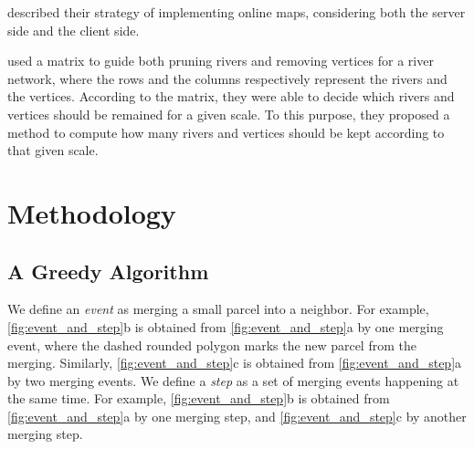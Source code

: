 \documentclass[ijgi,article,submit,moreauthors,pdftex]{Definitions/mdpi}
\begin{document}
\citet{Huang2016Webmap} described their strategy of implementing online maps, 
considering both the server side and the client side.

\citet{Huang2017Matrix} used a matrix to guide 
both pruning rivers and removing vertices for a river network, 
where the rows and the columns respectively represent
the rivers and the vertices.
According to the matrix, 
they were able to decide which rivers and vertices 
should be remained for a given scale.
To this purpose, they proposed a method 
to compute how many rivers and vertices 
should be kept according to that given scale.

\citet{Thiemann2018LandCover}

\citet{Meijers2020Web}




%

\section{Methodology}

\subsection{A Greedy Algorithm}
\label{sec:greedy_algo}




We define an \emph{event} as merging a small parcel into a neighbor.
For example, \fig\ref{fig:event_and_step}b is obtained from 
\fig\ref{fig:event_and_step}a by one merging event,
where the dashed rounded polygon marks the new parcel from the merging.
Similarly, \fig\ref{fig:event_and_step}c is obtained from 
\fig\ref{fig:event_and_step}a by two merging events.
We define a \emph{step} as 
a set of merging events happening at the same time.
For example, \fig\ref{fig:event_and_step}b is obtained from 
\fig\ref{fig:event_and_step}a by one merging step,
and \fig\ref{fig:event_and_step}c by another merging step.
\end{document}

